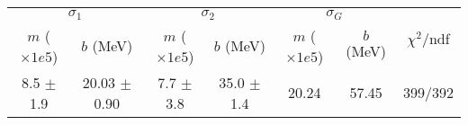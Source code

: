 \begin{tabular}{cc|cc|cc||c}
\multicolumn{2}{c|}{$\sigma_1$} & \multicolumn{2}{|c}{$\sigma_2$} & \multicolumn{2}{|c}{$\sigma_G$}  & \multirow{2}{*}{$\chi^2/$ndf}\\
$m$ ($\times1e5$) & $b$ (MeV) & $m$ ($\times1e5$) & $b$ (MeV) & $m$ ($\times1e5$) & $b$ (MeV) & \\
\hline
8.5 $\pm$ 1.9 & 20.03 $\pm$ 0.90 & 7.7 $\pm$ 3.8 & 35.0 $\pm$ 1.4 & 20.24 & 57.45 & 399/392\\
\end{tabular}
